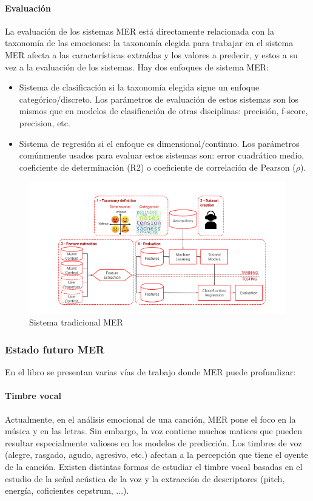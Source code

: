 \documentclass[12pt,a4paper,Spanish]{article}
\begin{document}
\paragraph{Evaluación}
La evaluación de los sistemas MER está directamente relacionada con la taxonomía de las emociones: la taxonomía elegida para trabajar en el sistema MER afecta a las características extraídas y los valores a predecir, y estos a su vez a la evaluación de los sistemas. Hay dos enfoques de sistema MER:
\begin{itemize}
	\item Sistema de clasificación si la taxonomía elegida sigue un enfoque categórico/discreto. Los parámetros de evaluación de estos sistemas son los mismos que en modelos de clasificación de otras disciplinas: precisión, f-score, precision, etc.
	\item Sistema de regresión si el enfoque es dimensional/continuo. Los parámetros comúnmente usados para evaluar estos sistemas son: error cuadrático medio, coeficiente de determinación (R2) o coeficiente de correlación de Pearson ($\rho$).
\end{itemize}
\begin{figure}[H]
	\centering
	\includegraphics[width=0.7\linewidth]{figs/mer_traditional_system}
	\caption{Sistema tradicional MER}
	\label{fig:mertraditionalsystem}
\end{figure}
\subsubsection{Estado futuro MER}
En el libro  se presentan varias vías de trabajo donde MER puede profundizar:

\paragraph{Timbre vocal}
Actualmente, en el análisis emocional de una canción, MER pone el foco en la música y en las letras. Sin embargo, la voz contiene muchos matices que pueden resultar  especialmente valiosos en los modelos de predicción. Los timbres de voz (alegre, rasgado, agudo, agresivo, etc.) afectan a la percepción que tiene el oyente de la canción.
\newline
Existen distintas formas de estudiar el timbre vocal basadas en el estudio de la señal acústica de la voz y la extracción de descriptores (pitch, energía, coficientes cepstrum, ...).
\end{document}
